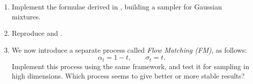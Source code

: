 \documentclass[../../book-main.tex]{subfiles}
\begin{document}
\begin{exercise}\label{exercise:implement_denoising_processes}
\begin{enumerate}
    \item Implement the formulae derived in , building a sampler for Gaussian mixtures.
    \item Reproduce  and .
    \item We now introduce a separate process called \textit{Flow Matching (FM)}, as follows:
    \begin{equation}
        \alpha_{t} = 1 - t, \qquad \sigma_{t} = t.
    \end{equation}
    Implement this process using the same framework, and test it for sampling in high dimensions. Which process seems to give better or more stable results?
\end{enumerate}
\end{exercise}

\end{document}
